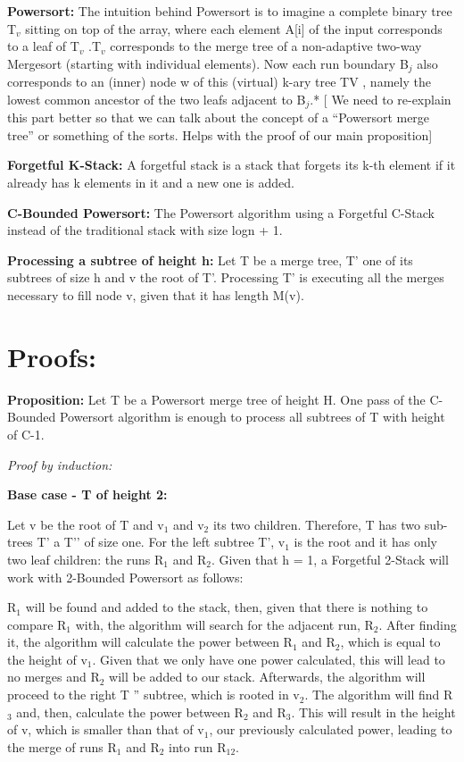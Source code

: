 \documentclass{article}
\begin{document}
\textbf{Powersort:} The intuition behind Powersort is to imagine a complete binary tree T$_v$ sitting on top of the array, where each element A[i] of the input corresponds to a leaf of T$_v$ .T$_v$ corresponds to the merge tree of a non-adaptive two-way Mergesort (starting with individual elements). Now each run boundary B$_j$ also corresponds to an (inner) node w of this (virtual) k-ary tree TV , namely the lowest common ancestor of the two leafs adjacent to B$_j$.* [ We need to re-explain this part better so that we can talk about the concept of a “Powersort merge tree” or something of the sorts. Helps with the proof of our main proposition]  

\textbf{Forgetful K-Stack:} A forgetful stack is a stack that forgets its k-th element if it already has k elements in it and a new one is added. 

\textbf{C-Bounded Powersort:} The Powersort algorithm using a Forgetful C-Stack instead of the traditional stack with size logn + 1. 

\textbf{Processing a subtree of height h:} Let T be a merge tree, T’ one of its subtrees of size h and v the root of T’. Processing T’ is executing all the merges necessary to fill node v, given that it has length M(v). 

\section*{Proofs:} 

\textbf{Proposition:} Let T be a Powersort merge tree of height H. One pass of the C-Bounded Powersort algorithm is enough to process all subtrees of T with height of C-1.

\textit{Proof by induction:}  

\textbf{Base case - T of height 2:}

Let v be the root of T and v$_1$ and v$_2$ its two children. Therefore, T has two sub-trees T’ a T’’ of size one. For the left subtree T', v$_1$ is the root and it has only two leaf children: the runs R$_1$ and R$_2$. Given that h = 1, a Forgetful 2-Stack will work with 2-Bounded Powersort as follows: 

R$_1$  will be found and added to the stack, then, given that there is nothing to compare R$_1$  with, the algorithm will search for the adjacent run, R$_2$. After finding it, the algorithm will calculate the power between R$_1$ and R$_2$, which is equal to the height of v$_1$. Given that we only have one power calculated, this will lead to no merges and R$_2$ will be added to our stack. Afterwards, the algorithm will proceed to the right T '' subtree, which is rooted in v$_2$. The algorithm will find R$_3$ and, then, calculate the power between R$_2$ and R$_3$. This will result in the height of v, which is smaller than that of v$_1$, our previously calculated power, leading to the merge of runs R$_1$ and R$_2$ into run R$_{12}$. 
\end{document}
